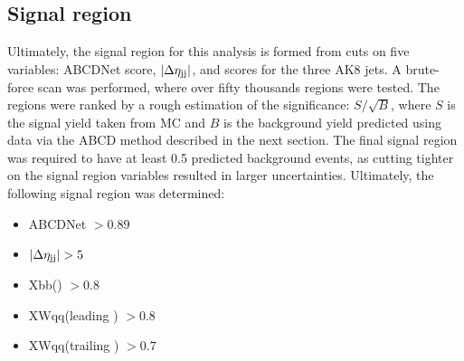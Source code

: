 \subsection{Signal region}
Ultimately, the signal region for this analysis is formed from cuts on five variables: ABCDNet score, $|\Delta\eta_{\mathrm{j}\mathrm{j}}|$, and \ParticleNet scores for the three AK8 jets. 
A brute-force scan was performed, where over fifty thousands regions were tested. 
The regions were ranked by a rough estimation of the significance: $S/\sqrt{B}$, where $S$ is the signal yield taken from MC and $B$ is the background yield predicted using data via the ABCD method described in the next section.
The final signal region was required to have at least 0.5 predicted background events, as cutting tighter on the signal region variables resulted in larger uncertainties. 
Ultimately, the following signal region was determined:
\begin{itemize}
    \item ABCDNet $> 0.89$
    \item $|\Delta\eta_{\mathrm{j}\mathrm{j}}| > 5$
    \item Xbb(\Htobb) $> 0.8$
    \item XWqq(leading \Vtoqq) $> 0.8$
    \item XWqq(trailing \Vtoqq) $> 0.7$
\end{itemize}

